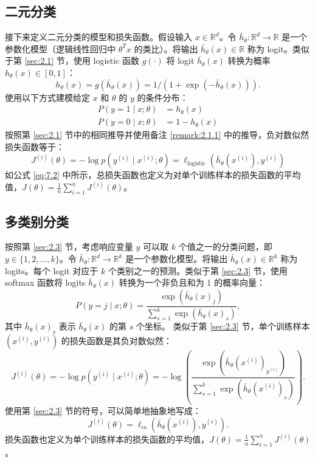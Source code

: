 \subsection*{二元分类}
接下来定义二元分类的模型和损失函数。假设输入 $x \in \mathbb{R}^d$。令 $\bar{h}_\theta: \mathbb{R}^d \to \mathbb{R}$ 是一个参数化模型（逻辑线性回归中 $\theta^T x$ 的类比）。将输出 $\bar{h}_\theta(x) \in \mathbb{R}$ 称为 logit。类似于第 \ref{sec:2.1} 节，使用 logistic 函数 $g(\cdot)$ 将 logit $\bar{h}_\theta(x)$ 转换为概率 $h_\theta(x) \in [0, 1]$：
\begin{equation} \label{eq:7.3}
    h_\theta(x) = g(\bar{h}_\theta(x)) = 1 / (1 + \exp(-\bar{h}_\theta(x))).
\end{equation}
使用以下方式建模给定 $x$ 和 $\theta$ 的 $y$ 的条件分布：
\[
\begin{aligned}
    P(y = 1 \mid x; \theta) &= h_\theta(x) \\
    P(y = 0 \mid x; \theta) &= 1 - h_\theta(x)
\end{aligned}
\]
按照第 \ref{sec:2.1} 节中的相同推导并使用备注 \ref{remark:2.1.1} 中的推导，负对数似然损失函数等于：
\begin{equation} \label{eq:7.4}
    J^{(i)}(\theta) = -\log p(y^{(i)} \mid x^{(i)}; \theta) = \ell_{\text{logistic}}(\bar{h}_\theta(x^{(i)}), y^{(i)})
\end{equation}
如公式 \eqref{eq:7.2} 中所示，总损失函数也定义为对单个训练样本的损失函数的平均值，$J(\theta) = \frac{1}{n} \sum_{i=1}^n J^{(i)}(\theta)$。

\subsection*{多类别分类}
按照第 \ref{sec:2.3} 节，考虑响应变量 $y$ 可以取 $k$ 个值之一的分类问题，即 $y \in \{1, 2, \dots, k\}$。令 $\bar{h}_\theta: \mathbb{R}^d \to \mathbb{R}^k$ 是一个参数化模型。将输出 $\bar{h}_\theta(x) \in \mathbb{R}^k$ 称为 logits。每个 logit 对应于 $k$ 个类别之一的预测。类似于第 \ref{sec:2.3} 节，使用 softmax 函数将 logits $\bar{h}_\theta(x)$ 转换为一个非负且和为 1 的概率向量：
\begin{equation} \label{eq:7.5}
    P(y = j \mid x; \theta) = \frac{\exp(\bar{h}_\theta(x)_j)}{\sum_{s=1}^k \exp(\bar{h}_\theta(x)_s)},
\end{equation}
其中 $\bar{h}_\theta(x)_s$ 表示 $\bar{h}_\theta(x)$ 的第 $s$ 个坐标。
类似于第 \ref{sec:2.3} 节，单个训练样本 $(x^{(i)}, y^{(i)})$ 的损失函数是其负对数似然：
\begin{equation} \label{eq:7.6}
    J^{(i)}(\theta) = -\log p(y^{(i)} \mid x^{(i)}; \theta) = -\log \left( \frac{\exp(\bar{h}_\theta(x^{(i)})_{y^{(i)}})}{\sum_{s=1}^k \exp(\bar{h}_\theta(x^{(i)})_s)} \right).
\end{equation}
使用第 \ref{sec:2.3} 节的符号，可以简单地抽象地写成：
\begin{equation} \label{eq:7.7}
    J^{(i)}(\theta) = \ell_{\text{ce}}(\bar{h}_\theta(x^{(i)}), y^{(i)}).
\end{equation}
损失函数也定义为单个训练样本的损失函数的平均值，$J(\theta) = \frac{1}{n} \sum_{i=1}^n J^{(i)}(\theta)$。

